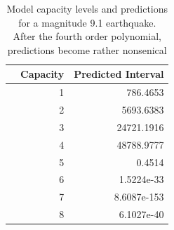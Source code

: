 \begin{table}[H]
\centering
\begin{tabular}{rrr}
  \hline
 & Capacity & Predicted Interval \\ 
  \hline
& 1 & 786.4653 \\ 
& 2 & 5693.6383 \\ 
& 3 & 24721.1916 \\ 
& 4 & 48788.9777 \\ 
& 5 & 0.4514 \\ 
& 6 & 1.5224e-33 \\ 
& 7 & 8.6087e-153 \\ 
& 8 & 6.1027e-40 \\ 
   \hline
\end{tabular}
\caption{\footnotesize Model capacity levels and predictions for a magnitude 9.1 earthquake.  After the fourth order polynomial, predictions become rather nonsenical}
\label{captable}
\end{table}

